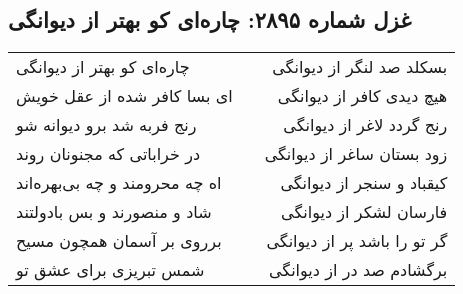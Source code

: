 \begin{center}
\section*{غزل شماره ۲۸۹۵: چاره‌ای کو بهتر از دیوانگی}
\label{sec:2895}
\begin{longtable}{l p{0.5cm} r}
چاره‌ای کو بهتر از دیوانگی
&&
بسکلد صد لنگر از دیوانگی
\\
ای بسا کافر شده از عقل خویش
&&
هیچ دیدی کافر از دیوانگی
\\
رنج فربه شد برو دیوانه شو
&&
رنج گردد لاغر از دیوانگی
\\
در خراباتی که مجنونان روند
&&
زود بستان ساغر از دیوانگی
\\
اه چه محرومند و چه بی‌بهره‌اند
&&
کیقباد و سنجر از دیوانگی
\\
شاد و منصورند و بس بادولتند
&&
فارسان لشکر از دیوانگی
\\
برروی بر آسمان همچون مسیح
&&
گر تو را باشد پر از دیوانگی
\\
شمس تبریزی برای عشق تو
&&
برگشادم صد در از دیوانگی
\\
\end{longtable}
\end{center}
